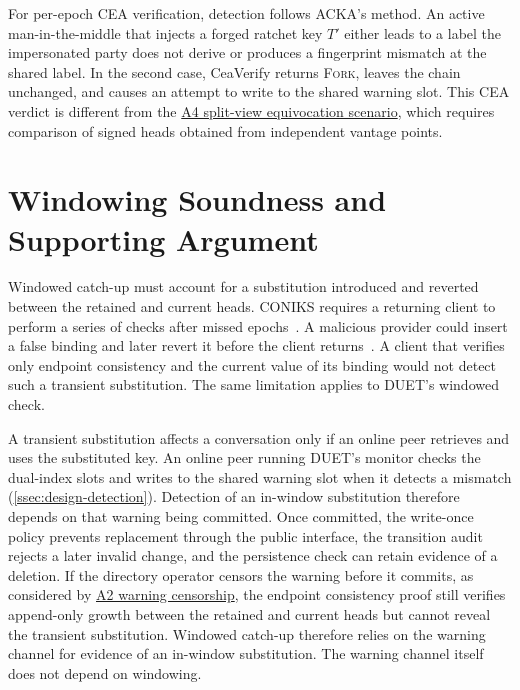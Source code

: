 For per-epoch CEA verification, detection follows ACKA's method. An active man-in-the-middle that
injects a forged ratchet key $T'$ either leads to a label the impersonated party does not derive or
produces a fingerprint mismatch at the shared label. In the second case, \textsf{CeaVerify} returns
\textsc{Fork}, leaves the chain unchanged, and causes an attempt to write to the shared warning slot. This CEA verdict
is different from the \hyperref[sc:threat-a4]{A4 split-view equivocation scenario}, which requires
comparison of signed heads obtained from independent vantage points.

\section{Windowing Soundness and Supporting Argument}\label{sec:design-detail-window}

Windowed catch-up must account for a substitution introduced and reverted between the retained and
current heads. CONIKS requires a returning client to perform a series of checks after missed
epochs~\cite{melara2015coniks}. A malicious provider could insert a false binding and
later revert it before the client returns~\cite[Section~4.2]{chase2019seemless}. A client that verifies only endpoint consistency and the
current value of its binding would not detect such a transient substitution. The same limitation
applies to DUET's windowed check.

A transient substitution affects a conversation only if an online peer retrieves and uses the
substituted key. An online peer running DUET's monitor checks the dual-index slots and writes to the
shared warning slot when it detects a mismatch (\cref{ssec:design-detection}). Detection of an
in-window substitution therefore depends on that warning being committed. Once committed, the
write-once policy prevents replacement through the public interface, the transition audit rejects a
later invalid change, and the persistence check can retain evidence of a deletion. If the directory
operator censors the warning before it commits, as considered by
\hyperref[sc:threat-a2]{A2 warning censorship}, the endpoint consistency proof still verifies
append-only growth between the retained and current heads but cannot reveal the transient
substitution. Windowed catch-up therefore relies on the warning channel for evidence of an
in-window substitution. The warning channel itself does not depend on windowing.

